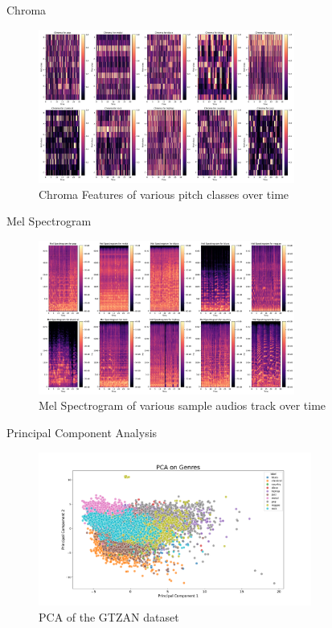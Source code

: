 \documentclass{beamer}
\begin{document}
\begin{frame}{Chroma}

  \begin{figure}
    \centering
    \includegraphics[width=0.75\textwidth]{images/chroma.pdf}
    \caption{Chroma Features of various pitch classes over time}
  \end{figure}
\end{frame}

\begin{frame}{Mel Spectrogram}
  \begin{figure}
    \centering
    \includegraphics[width=0.75\textwidth]{images/mel.pdf}
    \caption{Mel Spectrogram of various sample audios track over time}
  \end{figure}
\end{frame}

\begin{frame}{Principal Component Analysis}
  \begin{figure}
    \centering
    \includegraphics[width=0.8\textwidth]{images/pca.pdf}
    \caption{PCA of the GTZAN dataset}
  \end{figure}
\end{frame}
\end{document}
